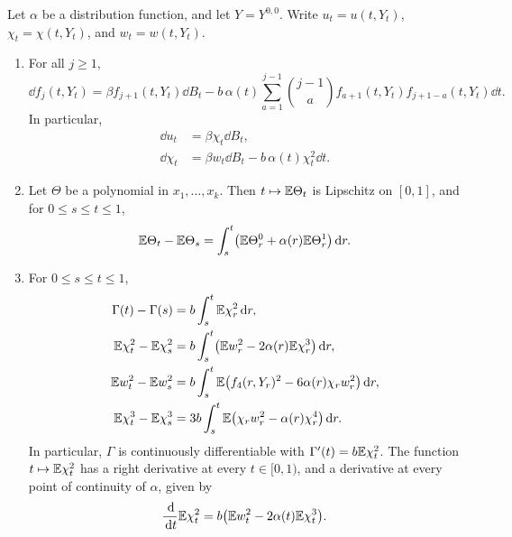 \begin{lemma}
\label{lem:sc-ito}
Let $\alpha$ be a distribution function, and let $Y=Y^{0,0}$. Write
$u_t=u(t,Y_t)$, $\chi_t=\chi(t,Y_t)$, and $w_t=w(t,Y_t)$.
\begin{enumerate}[label=\textup{(\roman*)}]
\item For all $j\ge1$,
  \begin{equation}\label{b:eq:os-jet-generator}
   \dd f_j(t,Y_t)=\beta f_{j+1}(t,Y_t)\dd B_t
     -b\,\alpha(t)\sum_{a=1}^{j-1}\binom{j-1}a
       f_{a+1}(t,Y_t)f_{j+1-a}(t,Y_t)\dd t.
  \end{equation}
  In particular,
  \begin{align}
   \dd u_t&=\beta\chi_t\dd B_t,\label{b:eq:u-martingale}\\
   \dd\chi_t&=\beta w_t\dd B_t-b\,\alpha(t)\chi_t^2\dd t.
     \label{b:eq:chi-evolution}
  \end{align}
\item Let $\Theta$ be a polynomial in $x_1,\dots,x_k$. Then
  $t\mapsto\mathbb E\Theta_t$ is Lipschitz on $[0,1]$, and for
  $0\le s\le t\le1$,
  \begin{equation}\label{eq:sc-moment-identity}
   \mathbb E\Theta_t-\mathbb E\Theta_s
   =\int_s^t\bigl(\mathbb E\Theta^0_r+\alpha(r)\mathbb E\Theta^1_r\bigr)\,\mathrm d r.
  \end{equation}
\item For $0\le s\le t\le1$,
  \begin{equation}\label{eq:sc-moments}
  \begin{aligned}
   \Gamma(t)-\Gamma(s)&=b\int_s^t\mathbb E\chi_r^2\,\mathrm d r,\\
   \mathbb E\chi_t^2-\mathbb E\chi_s^2
     &=b\int_s^t\bigl(\mathbb E w_r^2-2\alpha(r)\mathbb E\chi_r^3\bigr)\,\mathrm d r,\\
   \mathbb E w_t^2-\mathbb E w_s^2
     &=b\int_s^t\mathbb E\bigl(f_4(r,Y_r)^2-6\alpha(r)\chi_rw_r^2\bigr)\,\mathrm d r,\\
   \mathbb E\chi_t^3-\mathbb E\chi_s^3
     &=3b\int_s^t\mathbb E\bigl(\chi_rw_r^2-\alpha(r)\chi_r^4\bigr)\,\mathrm d r.
  \end{aligned}
  \end{equation}
  In particular, $\Gamma$ is continuously differentiable with
  $\Gamma'(t)=b\mathbb E\chi_t^2$. The function $t\mapsto\mathbb E\chi_t^2$ has a right
  derivative at every $t\in[0,1)$, and a derivative at every point of
  continuity of $\alpha$, given by
  \begin{equation}\label{b:eq:contact-derivative}
   \frac{\,\mathrm d}{\,\mathrm d t}\mathbb E\chi_t^2=b\bigl(\mathbb E w_t^2-2\alpha(t)\mathbb E\chi_t^3\bigr).
  \end{equation}
\end{enumerate}
\end{lemma}


